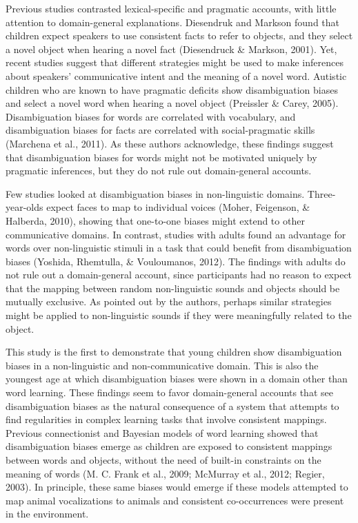 \documentclass[english,floatsintext,man]{apa6}
\newcounter{author}
\theoremstyle{definition}
\theoremstyle{definition}
\theoremstyle{definition}
\theoremstyle{remark}
\begin{document}
Previous studies contrasted lexical-specific and pragmatic accounts,
with little attention to domain-general explanations. Diesendruk and
Markson found that children expect speakers to use consistent facts to
refer to objects, and they select a novel object when hearing a novel
fact (Diesendruck \& Markson, 2001). Yet, recent studies suggest that
different strategies might be used to make inferences about speakers'
communicative intent and the meaning of a novel word. Autistic children
who are known to have pragmatic deficits show disambiguation biases and
select a novel word when hearing a novel object (Preissler \& Carey,
2005). Disambiguation biases for words are correlated with vocabulary,
and disambiguation biases for facts are correlated with social-pragmatic
skills (Marchena et al., 2011). As these authors acknowledge, these
findings suggest that disambiguation biases for words might not be
motivated uniquely by pragmatic inferences, but they do not rule out
domain-general accounts.

Few studies looked at disambiguation biases in non-linguistic domains.
Three-year-olds expect faces to map to individual voices (Moher,
Feigenson, \& Halberda, 2010), showing that one-to-one biases might
extend to other communicative domains. In contrast, studies with adults
found an advantage for words over non-linguistic stimuli in a task that
could benefit from disambiguation biases (Yoshida, Rhemtulla, \&
Vouloumanos, 2012). The findings with adults do not rule out a
domain-general account, since participants had no reason to expect that
the mapping between random non-linguistic sounds and objects should be
mutually exclusive. As pointed out by the authors, perhaps similar
strategies might be applied to non-linguistic sounds if they were
meaningfully related to the object.

This study is the first to demonstrate that young children show
disambiguation biases in a non-linguistic and non-communicative domain.
This is also the youngest age at which disambiguation biases were shown
in a domain other than word learning. These findings seem to favor
domain-general accounts that see disambiguation biases as the natural
consequence of a system that attempts to find regularities in complex
learning tasks that involve consistent mappings. Previous connectionist
and Bayesian models of word learning showed that disambiguation biases
emerge as children are exposed to consistent mappings between words and
objects, without the need of built-in constraints on the meaning of
words (M. C. Frank et al., 2009; McMurray et al., 2012; Regier, 2003).
In principle, these same biases would emerge if these models attempted
to map animal vocalizations to animals and consistent co-occurrences
were present in the environment.
\end{document}
